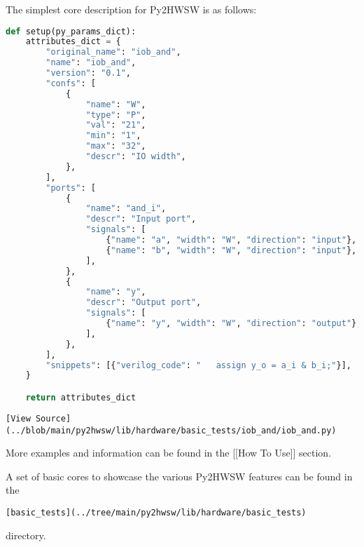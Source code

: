 %

The simplest core description for Py2HWSW is as follows:

\begin{lstlisting}[language=Python]
def setup(py_params_dict):
    attributes_dict = {
        "original_name": "iob_and",
        "name": "iob_and",
        "version": "0.1",
        "confs": [
            {
                "name": "W",
                "type": "P",
                "val": "21",
                "min": "1",
                "max": "32",
                "descr": "IO width",
            },
        ],
        "ports": [
            {
                "name": "and_i",
                "descr": "Input port",
                "signals": [
                    {"name": "a", "width": "W", "direction": "input"},
                    {"name": "b", "width": "W", "direction": "input"},
                ],
            },
            {
                "name": "y",
                "descr": "Output port",
                "signals": [
                    {"name": "y", "width": "W", "direction": "output"},
                ],
            },
        ],
        "snippets": [{"verilog_code": "   assign y_o = a_i & b_i;"}],
    }

    return attributes_dict
\end{lstlisting}
\begin{verbatim}
[View Source](../blob/main/py2hwsw/lib/hardware/basic_tests/iob_and/iob_and.py)
\end{verbatim}

More examples and information can be found in the [[How To Use]] section.

A set of basic cores to showcase the various Py2HWSW features can be found in
the
\begin{verbatim}
[basic_tests](../tree/main/py2hwsw/lib/hardware/basic_tests)
\end{verbatim}
directory.

